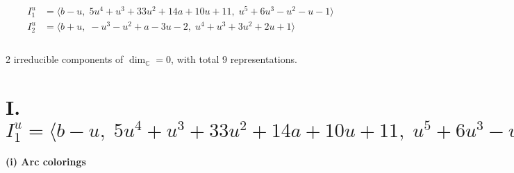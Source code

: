 \documentclass[1p]{elsarticle_modified}
\theoremstyle{definition}
\begin{document}
\begin{align*}
I^u_{1}&=\langle 
b- u,\;5 u^4+u^3+33 u^2+14 a+10 u+11,\;u^5+6 u^3- u^2- u-1\rangle \\
I^u_{2}&=\langle 
b+u,\;- u^3- u^2+a-3 u-2,\;u^4+u^3+3 u^2+2 u+1\rangle \\
\\
\end{align*}
\raggedright * 2 irreducible components of $\dim_{\mathbb{C}}=0$, with total 9 representations.\\
\newpage
\renewcommand{\arraystretch}{1}
\centering \section*{I. $I^u_{1}= \langle b- u,\;5 u^4+u^3+33 u^2+14 a+10 u+11,\;u^5+6 u^3- u^2- u-1 \rangle$}
\flushleft \textbf{(i) Arc colorings}\\
\end{document}
